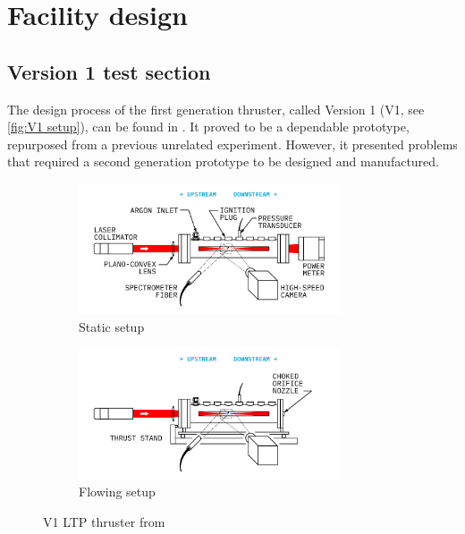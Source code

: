 \chapter{Facility design}

    \section{Version 1 test section} \label{sec:design_v1}

        The design process of the first generation thruster, called Version 1 (V1, see \autoref{fig:V1 setup}), can be found in \textcite{duplayArgonLaserPlasmaThruster2024a}. It proved to be a dependable prototype, repurposed from a previous unrelated experiment. However, it presented problems that required a second generation prototype to be designed and manufactured.

        \begin{figure}[!ht]
            \centering
            \begin{subfigure}[t]{\textwidth}
                \centering
                \includegraphics[width=0.85\textwidth]{assets/3 design/finalsetup_static.pdf}
                \caption{Static setup}
            \end{subfigure}
            \hfill
            \begin{subfigure}[t]{\textwidth}
                \centering
                \includegraphics[width=0.85\textwidth]{assets/3 design/finalsetup_flowing.pdf}
                \caption{Flowing setup}
            \end{subfigure}
            \caption{V1 LTP thruster from \textcite{duplayArgonLaserPlasmaThruster2024a}}
            \label{fig:V1 setup}
        \end{figure}

